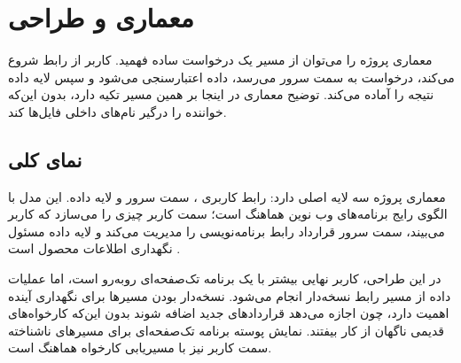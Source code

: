 \chapter{معماری و طراحی}

معماری پروژه را می‌توان از مسیر یک درخواست ساده فهمید. کاربر از رابط  شروع می‌کند، درخواست به سمت سرور  می‌رسد، داده اعتبارسنجی می‌شود و سپس لایه داده نتیجه را آماده می‌کند. توضیح معماری در اینجا بر همین مسیر تکیه دارد، بدون این‌که خواننده را درگیر نام‌های داخلی فایل‌ها کند.

\section{نمای کلی}
معماری پروژه سه لایه اصلی دارد: رابط کاربری ، سمت سرور  و لایه داده. این مدل با الگوی رایج برنامه‌های وب نوین هماهنگ است؛ سمت کاربر چیزی را می‌سازد که کاربر می‌بیند، سمت سرور قرارداد رابط برنامه‌نویسی را مدیریت می‌کند و لایه داده مسئول نگهداری اطلاعات محصول است \cite{react,drf,mongodb}.

در این طراحی، کاربر نهایی بیشتر با یک برنامه تک‌صفحه‌ای روبه‌رو است، اما عملیات داده از مسیر رابط نسخه‌دار انجام می‌شود. نسخه‌دار بودن مسیرها برای نگهداری آینده اهمیت دارد، چون اجازه می‌دهد قراردادهای جدید اضافه شوند بدون این‌که کارخواه‌های قدیمی ناگهان از کار بیفتند. نمایش پوسته برنامه تک‌صفحه‌ای برای مسیرهای ناشناخته سمت کاربر نیز با مسیریابی کارخواه هماهنگ است.

